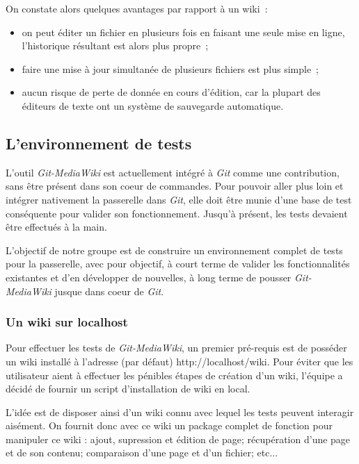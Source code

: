 \documentclass[11pt]{article}
\begin{document}
On constate alors quelques avantages par rapport à un wiki~:

\begin{itemize}
\item on peut éditer un fichier en plusieurs fois en faisant une seule
  mise en ligne, l'historique résultant est alors plus propre~;
\item faire une mise à jour simultanée de plusieurs fichiers est plus simple~;
\item aucun risque de perte de donnée en cours d'édition, car la plupart
  des éditeurs de texte ont un système de sauvegarde automatique.
\end{itemize}

\subsection{L'environnement de tests}

L'outil \textit{Git-MediaWiki} est actuellement intégré à \textit{Git}
comme une contribution, sans être présent dans son coeur de
commandes. Pour pouvoir aller plus loin et intégrer nativement la
passerelle dans \textit{Git}, elle doit être munie d'une base de test
conséquente pour valider son fonctionnement. Jusqu'à présent, les
tests devaient être effectués à la main.

L'objectif de notre groupe est de construire un environnement complet
de tests pour la passerelle, avec pour objectif, à court terme de
valider les fonctionnalités existantes et d'en développer de
nouvelles, à long terme de pousser \textit{Git-MediaWiki} jusque
dans coeur de \textit{Git}.

\subsubsection{Un wiki sur localhost}

Pour effectuer les tests de \textit{Git-MediaWiki}, un premier 
pré-requis est de posséder un wiki installé à l'adresse (par défaut) 
http://localhost/wiki. Pour éviter que les utilisateur aient à 
effectuer les pénibles étapes de création d'un wiki, l'équipe a
décidé de fournir un script d'installation de wiki en local.

L'idée est de disposer ainsi d'un wiki connu avec lequel les tests 
peuvent interagir aisément. On fournit donc avec ce wiki un 
package complet de fonction pour manipuler ce wiki : ajout, 
supression et édition de page; récupération d'une page et de son 
contenu; comparaison d'une page et d'un fichier; etc...
\end{document}
